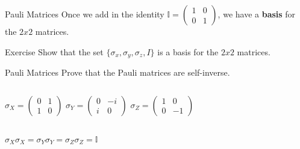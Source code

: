 \documentclass{beamer}
\begin{document}
\begin{frame}{Pauli Matrices}
    Once we add in the identity $\mathbb{I}= \begin{pmatrix} 1 & 0 \\ 0 & 1 \end{pmatrix}$, we have a \textbf{basis} for the $2x2$ matrices.\vfill
    \begin{block}{Exercise}
        Show that the set $\{\sigma_x,\sigma_y,\sigma_z, I\}$ is a basis for the $2x2$ matrices.
    \end{block}
\end{frame}

\begin{frame}{Pauli Matrices}
    Prove that the Pauli matrices are self-inverse.
\vfill
\centering
    \begin{columns}
        \centering
        \begin{math}
        \sigma_{X} =
            \begin{pmatrix}
                0 & 1 \\ 1 & 0
            \end{pmatrix}
        \end{math}
        \centering
        \begin{math}
        \sigma_{Y} =
            \begin{pmatrix}
                0 & -i \\ i & 0
            \end{pmatrix}
        \end{math}
        \centering
        \begin{math}
        \sigma_{Z} =
            \begin{pmatrix}
                1 & 0 \\ 0 & -1
            \end{pmatrix}
        \end{math} 
    \end{columns}\vfill
    \begin{math}
        \sigma_{X}\sigma_{X} = \sigma_{Y}\sigma_{Y} = \sigma_{Z}\sigma_{Z} = \mathbb{I}
    \end{math}
\end{frame}
\end{document}
